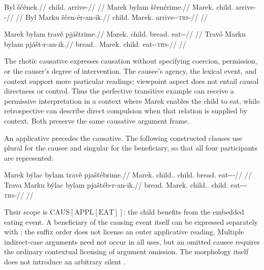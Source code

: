 \pex\label{ex:val-unaccusative}
\a
\begingl
\gla Byl ščének.//
\glb child.\Dir{} arrive-\Pf{}//
\glft {}//
\endgl
\a
\begingl
\gla Marek bylam ščenérime.//
\glb Marek.\Dir{} child.\Ind{} arrive-\Caus{}-\Prog{}//
\glft {}//
\endgl
\a
\begingl
\gla Byl Marku ščen-ér-an-ik.//
\glb child.\Dir{} Marek.\Trs{} arrive-\Caus{}-\textsc{trs}-\Pf{}//
\glft {}//
\endgl
\xe

\pex\label{ex:val-caus-transitive}
\a
\begingl
\gla Marek bylam travě pjáštrime.//
\glb Marek.\Dir{} child.\Ind{} bread.\Ind{} eat-\Caus{}-\Prog{}//
\glft {}//
\endgl
\a
\begingl
\gla Travó Marku bylam pjášt-r-an-ik.//
\glb bread.\Dir{}.\Def{} Marek.\Trs{} child.\Ind{} eat-\Caus{}-\textsc{trs}-\Pf{}//
\glft {}//
\endgl
\xe

The rhotic causative expresses causation without specifying coercion, permission, or the
causer's degree of intervention. The causee's agency, the lexical event, and
context support more particular readings; viewpoint aspect does not entail
causal directness or control. Thus the perfective transitive example can
receive a permissive interpretation in a context where Marek enables the
child to eat, while retrospective  can describe direct
compulsion when that relation is supplied by context. Both preserve the same
causative argument frame.

An applicative precedes the causative. The following constructed clauses use
plural  for the causee and singular  for the beneficiary,
so that all four participants are represented:

\pex\label{ex:val-caus-appl}
\a
\begingl
\gla Marek býlac bylam travě pjaštébrime.//
\glb Marek.\Dir{} child.\Ind{}.\Pl{} child.\Ind{} bread.\Ind{} eat-\Appl{}-\Caus{}-\Prog{}//
\glft {}//
\endgl
\a
\begingl
\gla Trava Marku býlac bylam pjaštéb-r-an-ik.//
\glb bread.\Dir{} Marek.\Trs{} child.\Ind{}.\Pl{} child.\Ind{} eat-\Appl{}-\Caus{}-\textsc{trs}-\Pf{}//
\glft {}//
\endgl
\xe

Their scope is $\mathrm{CAUS}[\mathrm{APPL}[\mathrm{EAT}]]$: the child benefits
from the embedded eating event. A beneficiary of the causing event itself can
be expressed separately with ; the suffix order does not license an
outer applicative reading. Multiple indirect-case arguments need not occur in
all uses, but an omitted causee requires the ordinary contextual licensing of
argument omission. The morphology itself does not introduce an arbitrary
silent .

